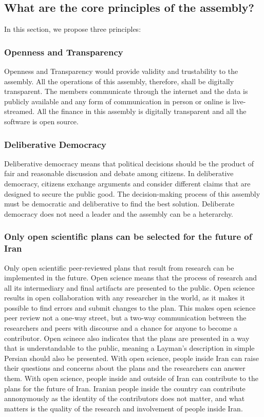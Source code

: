 \documentclass{IEEEtran}
\begin{document}
\subsection{What are the core principles of the assembly?}
In this section, we propose three principles:
\subsubsection{Openness and Transparency}
Openness and Transparency would provide validity and trustability to the assembly. All the operations of this assembly, therefore, shall be digitally transparent. The members communicate through the internet and the data is publicly available and any form of communication in person or online is live-streamed. All the finance in this assembly is digitally transparent and all the software is open source.

\subsubsection{Deliberative Democracy}
Deliberative democracy means that political decisions should be the product of fair and reasonable discussion and debate among citizens. In deliberative democracy, citizens exchange arguments and consider different claims that are designed to secure the public good. The decision-making process of this assembly must be democratic and deliberative to find the best solution. Deliberate democracy does not need a leader and the assembly can be a heterarchy. 

\subsubsection{Only open scientific plans can be selected for the future of Iran}
Only open scientific peer-reviewed plans that result from research can be implemented in the future. 
Open science means that the process of research and all its intermediary and final artifacts are presented to the public. 
Open science results in open collaboration with any researcher in the world, as it makes it possible to find errors and submit changes to the plan. 
This makes open science peer review not a one-way street, but a two-way communication between the researchers and peers with discourse and a chance for anyone to become a contributor. 
Open scinece also indicates that the plans are presented in a way that is understandable to the public, meaning a Layman's description in simple Persian should also be presented. 
With open science, people inside Iran can raise their questions and concerns about the plans and the researchers can answer them.
With open science, people inside and outside of Iran can contribute to the plans for the future of Iran. Iranian people inside the country can contribute annonymously as the identity of the contributors does not matter, and what matters is the quality of the research and involvement of people inside Iran.
\end{document}
